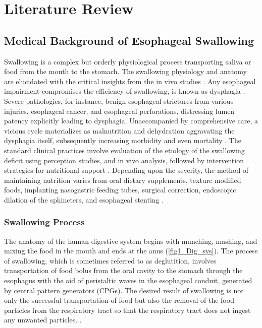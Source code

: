 \chapter{Literature Review}\label{ch:methodology}

\section{Medical Background of Esophageal Swallowing}

Swallowing is a complex but orderly physiological process transporting saliva or food from the mouth to the stomach. The swallowing physiology and anatomy are elucidated with the critical insights from the in vivo studies \citep{Dodds1989}. Any esophageal impairment compromises the efficiency of swallowing, is known as dysphagia \citep{Groher2015}. Severe pathologies, for instance, benign esophageal strictures from various injuries, esophageal cancer, and esophageal perforations, distressing lumen patency explicitly leading to dysphagia. Unaccompanied by comprehensive care, a vicious cycle materializes as malnutrition and dehydration aggravating the dysphagia itself, subsequently increasing morbidity and even mortality \citep{Garcia2010}. The standard clinical practices involve evaluation of the etiology of the swallowing deficit using perception studies, and in vivo analysis, followed by intervention strategies for nutritional support \citep{Kuo2012}. Depending upon the severity, the method of maintaining nutrition varies from oral dietary supplements, texture modified foods, implanting nasogastric feeding tubes, surgical correction, endoscopic dilation of the sphincters, and esophageal stenting \cite{Groher2015,Cichero2017}.

\subsection{Swallowing Process}
The anatomy of the human digestive system begins with munching, mashing, and mixing the food in the mouth and ends at the anus (\autoref{fig1_Dig_sys}). The process of swallowing, which is sometimes referred to as deglutition, involves transportation of food bolus from the oral cavity to the stomach through the esophagus with the aid of peristaltic waves in the esophageal conduit, generated by central pattern generators (CPGs). 
The desired result of swallowing is not only the successful transportation of food but also the removal of the food particles from the respiratory tract so that the respiratory tract does not ingest any unwanted particles. \cite{Miller1986,Miller1987,lang2009brain}. 

